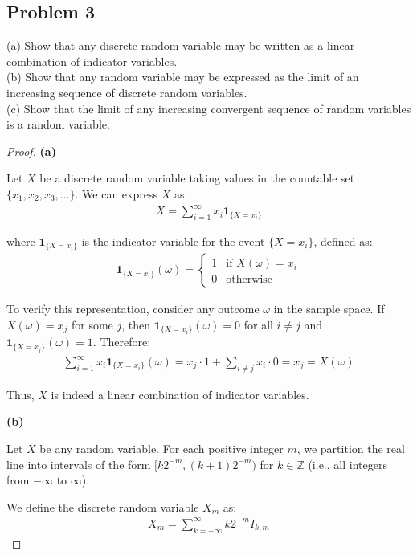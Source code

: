\documentclass[letterpaper, 11pt]{article}
\newcommand{\1}{\mathds{1}}	%
\theoremstyle{definition}
\begin{document}
\subsection*{Problem 3}
(a) Show that any discrete random variable may be written as a linear combination of indicator variables.
\\(b) Show that any random variable may be expressed as the limit of an increasing sequence of discrete random variables.
\\(c) Show that the limit of any increasing convergent sequence of random variables is a random variable.
\begin{proof}
    \textbf{(a)}

Let $X$ be a discrete random variable taking values in the countable set $\{x_1, x_2, x_3, \ldots\}$. We can express $X$ as:
\begin{align}
X = \sum_{i=1}^{\infty} x_i \mathbf{1}_{\{X = x_i\}}
\end{align}

where $\mathbf{1}_{\{X = x_i\}}$ is the indicator variable for the event $\{X = x_i\}$, defined as:
\begin{align*}
\mathbf{1}_{\{X = x_i\}}(\omega) = 
\begin{cases}
1 & \text{if } X(\omega) = x_i \\
0 & \text{otherwise}
\end{cases}
\end{align*}

To verify this representation, consider any outcome $\omega$ in the sample space. If $X(\omega) = x_j$ for some $j$, then $\mathbf{1}_{\{X = x_i\}}(\omega) = 0$ for all $i \neq j$ and $\mathbf{1}_{\{X = x_j\}}(\omega) = 1$. Therefore:
\begin{align*}
\sum_{i=1}^{\infty} x_i \mathbf{1}_{\{X = x_i\}}(\omega) = x_j \cdot 1 + \sum_{i \neq j} x_i \cdot 0 = x_j = X(\omega)
\end{align*}

Thus, $X$ is indeed a linear combination of indicator variables.

\textbf{(b)}

Let $X$ be any random variable. For each positive integer $m$, we partition the real line into intervals of the form $[k2^{-m}, (k+1)2^{-m})$ for $k \in \mathbb{Z}$ (i.e., all integers from $-\infty$ to $\infty$).

We define the discrete random variable $X_m$ as:
\begin{align}
X_m = \sum_{k=-\infty}^{\infty} k2^{-m} I_{k,m}
\end{align}


\end{proof}
\end{document}
